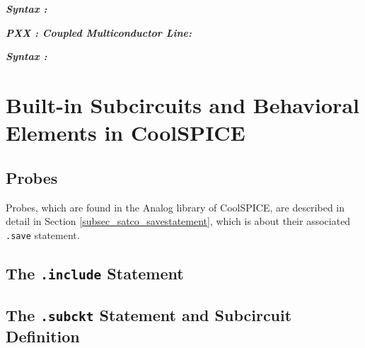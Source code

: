 \textbf{\textit{Syntax :}}



\textbf{\textit{PXX : Coupled Multiconductor Line:}}


\textbf{\textit{Syntax :}}



\section{Built-in Subcircuits and Behavioral Elements in CoolSPICE}
\label{sec_sceadm_builtinsubcircuits}

\subsection{Probes}
\label{subsec_sceadm_probes}

Probes, which are found in the \textsf{Analog} library of CoolSPICE, are described in detail in Section \ref{subsec_satco_savestatement}, which is about their associated \texttt{.save} statement.  

\subsection{The \texttt{.include} Statement}
\label{sec_sceadm_includestatement}

\subsection{The \texttt{.subckt} Statement and Subcircuit Definition}
\label{sec_sceadm_subcktstatement}


